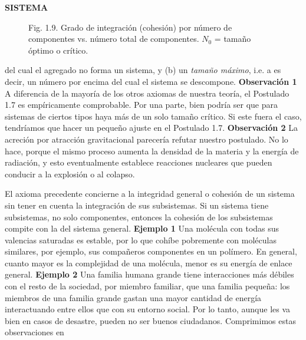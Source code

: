 \newpage
\fancyhf{}
\fancyhead[r]{\thepage}
\begin{center}
{\fontsize{16}{18}\selectfont \textbf{SISTEMA}}
\end{center}
\vspace{0.5cm}

{\fontsize{13}{15}\selectfont
\begin{figure}[h!]
    \centering
    \caption*{Fig. 1.9. Grado de integración (cohesión) por número de componentes vs. número total de componentes. \( N_0 \) = tamaño óptimo o crítico.}
\end{figure}
del cual el agregado no forma un sistema, y (b) un \textit{tamaño máximo}, i.e. a es decir, un número por encima del cual el sistema se descompone.
\textbf{Observación 1} A diferencia de la mayoría de los otros axiomas de nuestra teoría, el Postulado 1.7 es empíricamente comprobable. 
Por una parte, bien podría ser que para sistemas de ciertos tipos haya más de un solo tamaño crítico. Si este fuera el caso, tendríamos que hacer un pequeño ajuste en el Postulado 1.7.
 \textbf{Observación 2} La acreción por atracción gravitacional parecería refutar nuestro postulado. No lo hace, porque el mismo proceso aumenta la densidad de la materia y la energía de radiación, y esto eventualmente establece reacciones nucleares que pueden conducir a la explosión o al colapso. \par
El axioma precedente concierne a la integridad general o cohesión de un sistema sin tener en cuenta la integración de sus subsistemas. 
Si un sistema tiene subsistemas, no solo componentes, entonces la cohesión de los subsistemas compite con la del sistema general. \textbf{Ejemplo 1} Una molécula con todas sus valencias saturadas es estable, por lo que cohíbe pobremente con moléculas similares, por ejemplo, sus compañeros componentes en un polímero. 
En general, cuanto mayor es la complejidad de una molécula, menor es su energía de enlace general. \textbf{Ejemplo 2} Una familia humana grande tiene interacciones más débiles con el resto de la sociedad, por miembro familiar, que una familia pequeña: los miembros de una familia grande gastan una mayor cantidad de energía interactuando entre ellos que con su entorno social. 
Por lo tanto, aunque les va bien en casos de desastre, pueden no ser buenos ciudadanos.
Comprimimos estas observaciones en
}

